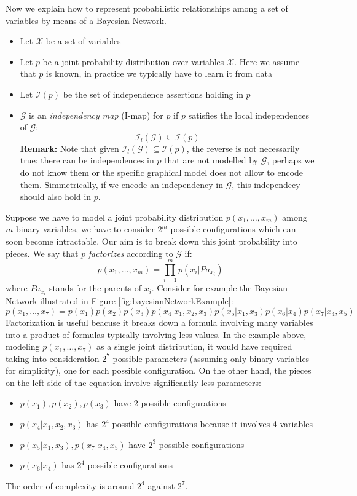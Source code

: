 Now we explain how to represent probabilistic relationships among a set of variables by means of a Bayesian Network.
\begin{itemize}
    \item Let $\mathcal{X}$ be a set of variables
    \item Let $p$ be a joint probability distribution over variables $\mathcal{X}$. Here we assume that $p$ is known, in practice we typically have to learn it from data
    \item Let $\mathcal{I}(p)$ be the set of independence assertions holding in $p$
    \item $\mathcal{G}$ is an \textit{independency map} (I-map) for $p$ if $p$ satisfies the local independences of $\mathcal{G}$:
    $$\mathcal{I}_l(\mathcal{G}) \subseteq \mathcal{I}(p)$$
    \textbf{Remark:} Note that given $\mathcal{I}_l(\mathcal{G}) \subseteq \mathcal{I}(p)$, the reverse is not necessarily true: there can be independences in $p$ that are not modelled by $\mathcal{G}$, perhaps we do not know them or the specific graphical model does not allow to encode them. Simmetrically, if we encode an independency in $\mathcal{G}$, this independecy should also hold in $p$.
\end{itemize}
Suppose we have to model a joint probability distribution $p(x_1, \hdots, x_m)$ among $m$ binary variables, we have to consider $2^m$ possible configurations which can soon become intractable. Our aim is to break down this joint probability into pieces. We say that $p$ \textit{factorizes} according to $\mathcal{G}$ if:
$$p(x_1, \hdots, x_m) = \prod_{i=1}^m p(x_i | \mathit{Pa}_{x_i})$$
where $\mathit{Pa}_{x_i}$ stands for the parents of $x_i$. Consider for example the Bayesian Network illustrated in Figure \ref{fig:bayesianNetworkExample}:
$$p(x_1, \hdots, x_7) = p(x_1)p(x_2)p(x_3)p(x_4|x_1,x_2,x_3)p(x_5|x_1,x_3)p(x_6|x_4)p(x_7|x_4,x_5)$$
Factorization is useful beacuse it breaks down a formula involving many variables into a product of formulas typically involving less values. In the example above, modeling $p(x_1,\hdots, x_7)$ as a single joint distribution, it would have required taking into consideration $2^7$ possible parameters (assuming only binary variables for simplicity), one for each possible configuration. On the other hand, the pieces on the left side of the equation involve significantly less parameters:
\begin{itemize}
    \item $p(x_1),p(x_2),p(x_3)$ have 2 possible configurations
    \item $p(x_4|x_1,x_2,x_3)$ has $2^4$ possible configurations because it involves 4 variables
    \item $p(x_5|x_1,x_3), p(x_7|x_4,x_5)$ have $2^3$ possible configurations
    \item $p(x_6|x_4)$ has $2^4$ possible configurations
\end{itemize}
The order of complexity is around $2^4$ against $2^7$. \newline

